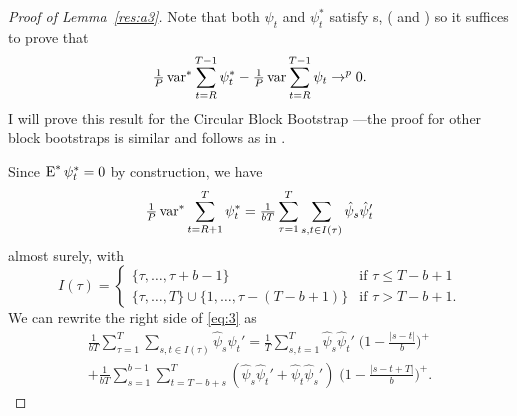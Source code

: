 \documentclass[12pt,fleqn]{article}
\begin{document}
\begin{proof}[Proof of Lemma~\ref{res:a3}]
  Note that both $\psi_t$ and $\psi_t^*$ satisfy
  \clt s, (\citealp[Theorem~2]{Jon:97} and
  \citealp[Theorem~1]{Cal:13}) so it suffices to prove that
  \[ \tfrac{ 1 }{ P } \operatorname{var}^* \sum_{t=R}^{T-1} \psi_t^*
  - \tfrac{ 1 }{ P } \operatorname{var} \sum_{t=R}^{T-1} \psi_t \to^p
  0. \] I will prove this result for the Circular Block Bootstrap
  \citep{PoR:92}---the proof for other block bootstraps is similar and
  follows as in \cite{Cal:13}.

  \newcommand{\su}{\tfrac{ 1 }{ b T } \sum_{ \tau = 1 }^{ T }%
  \sum_{ s, t \in I( \tau ) }}

  Since $\operatorname{E}^* \psi_t^* = 0$ by construction, we have
  \begin{equation}\label{eq:3}
  \tfrac{ 1 }{ P } \var^* \sum_{ t = R + 1 }^T \psi_t^*
  = \su \hat \psi_s \hat \psi_t'
  \end{equation}
  almost surely, with
  \begin{equation*}
    I(\tau) =
    \begin{cases}
      \{ \tau, \dots, \tau + b - 1 \} & \text{if } \tau \leq T - b + 1 \\
      \{ \tau, \dots, T \} \cup \{ 1, \dots, \tau - ( T - b + 1 ) \}
      & \text{if } \tau > T - b + 1.
    \end{cases}
  \end{equation*}
  We can rewrite the right side of \eqref{eq:3} as
  \begin{multline}\label{eq:6}
    \su \hat\psi_s \hat\psi_t'
    = \tfrac{1}{T} \sum_{s,t=1}^T \hat\psi_s \hat\psi_t' \;
      \big(1 - \tfrac{\lvert s - t \rvert}{b}\big)^+ \\
      + \tfrac{1}{bT} \sum_{s = 1}^{b - 1} \sum_{t = T - b + s}^{T}
        (\hat\psi_s \hat\psi_t' +
         \hat\psi_t \hat\psi_s') \;
        \big(1 - \tfrac{\lvert s - t + T\rvert}{b}\big)^+.
  \end{multline}


\end{proof}
\end{document}
